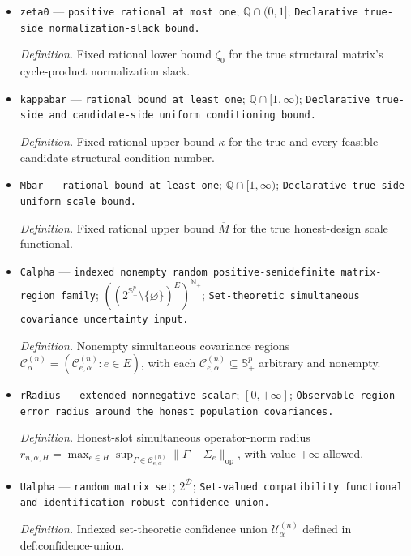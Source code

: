 \documentclass{article}
\begin{document}
\begin{itemize}
  \par\smallskip\noindent\emph{Definition.} Fixed rational lower bound \(\gamma_0\) for the true honest-design affine-minor separation.
  \item \texttt{zeta0} --- \texttt{positive rational at most one}; \(\mathbb Q\cap(0,1]\); \texttt{Declarative true-\allowbreak{}side normalization-\allowbreak{}slack bound.}
  \par\smallskip\noindent\emph{Definition.} Fixed rational lower bound \(\zeta_0\) for the true structural matrix's cycle-product normalization slack.
  \item \texttt{kappabar} --- \texttt{rational bound at least one}; \(\mathbb Q\cap[1,\infty)\); \texttt{Declarative true-\allowbreak{}side and candidate-\allowbreak{}side uniform conditioning bound.}
  \par\smallskip\noindent\emph{Definition.} Fixed rational upper bound \(\overline\kappa\) for the true and every feasible-candidate structural condition number.
  \item \texttt{Mbar} --- \texttt{rational bound at least one}; \(\mathbb Q\cap[1,\infty)\); \texttt{Declarative true-\allowbreak{}side uniform scale bound.}
  \par\smallskip\noindent\emph{Definition.} Fixed rational upper bound \(\overline M\) for the true honest-design scale functional.
  \item \texttt{Calpha} --- \texttt{indexed nonempty random positive-\allowbreak{}semidefinite matrix-\allowbreak{}region family}; \(((2^{\mathbb S_{+}^{p}}\setminus\{\varnothing\})^E)^{\mathbb N_{+}}\); \texttt{Set-\allowbreak{}theoretic simultaneous covariance uncertainty input.}
  \par\smallskip\noindent\emph{Definition.} Nonempty simultaneous covariance regions \(\mathcal C^{(n)}_{\alpha}=(\mathcal C^{(n)}_{e,\alpha}:e\in E)\), with each \(\mathcal C^{(n)}_{e,\alpha}\subseteq\mathbb S_{+}^p\) arbitrary and nonempty.
  \item \texttt{rRadius} --- \texttt{extended nonnegative scalar}; \([0,+\infty]\); \texttt{Observable-\allowbreak{}region error radius around the honest population covariances.}
  \par\smallskip\noindent\emph{Definition.} Honest-slot simultaneous operator-norm radius \(r_{n,\alpha,H}=\max_{e\in H}\sup_{\Gamma\in\mathcal C^{(n)}_{e,\alpha}}\|\Gamma-\Sigma_e\|_{\mathrm{op}}\), with value \(+\infty\) allowed.
  \item \texttt{Ualpha} --- \texttt{random matrix set}; \(2^{\mathcal D}\); \texttt{Set-\allowbreak{}valued compatibility functional and identification-\allowbreak{}robust confidence union.}
  \par\smallskip\noindent\emph{Definition.} Indexed set-theoretic confidence union \(\mathcal U^{(n)}_{\alpha}\) defined in \(\text{def:confidence-union}\).
\end{itemize}
\end{document}
